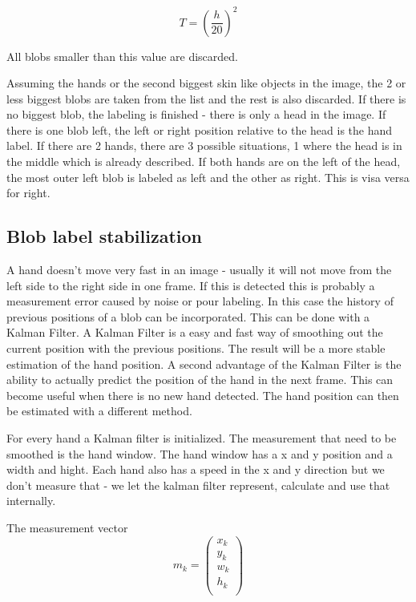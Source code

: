 \begin{equation}
T = (\frac{h}{20})^2
\end{equation}

All blobs smaller than this value are discarded. 

Assuming the hands or the second biggest skin like objects in the image, the 2 or less biggest blobs are taken from the list and the rest is also discarded. If there is no biggest blob, the labeling is finished - there is only a head in the image. If there is one blob left, the left or right position relative to the head is the hand label. If there are 2 hands, there are 3 possible situations, 1 where the head is in the middle which is already described. If both hands are on the left of the head, the most outer left blob is labeled as left and the other as right. This is visa versa for right.


\subsection*{Blob label stabilization}
A hand doesn't move very fast in an image - usually it will not move from the left side to the right side in one frame. If this is detected this is probably a measurement error caused by noise or pour labeling. In this case the history of previous positions of a blob can be incorporated. This can be done with a Kalman Filter. A Kalman Filter is a easy and fast way of smoothing out the current position with the previous positions. The result will be a more stable estimation of the hand position. A second advantage of the Kalman Filter is the ability to actually predict the position of the hand in the next frame. This can become useful when there is no new hand detected. The hand position can then be estimated with a different method.

For every hand a Kalman filter is initialized. The measurement that need to be smoothed is the hand window. The hand window has a x and y position and a width and hight. Each hand also has a speed in the x and y direction but we don't measure that - we let the kalman filter represent, calculate and use that internally. 

The measurement vector \[ m_k = \left(
\begin{array}{c}
	x_k \\ %
	y_k \\ %
	w_k \\ %
	h_k \\ %
\end{array} \right)\]


